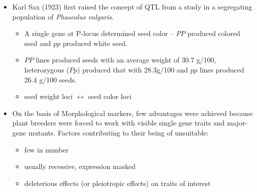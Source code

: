 \documentclass[11pt,dvipsnames,ignorenonframetext,aspectratio=169]{beamer}
\providecommand{\tightlist}{%
  \setlength{\itemsep}{0pt}\setlength{\parskip}{0pt}}
\begin{document}
\begin{frame}{}
\protect\hypertarget{section-3}{}
\begin{itemize}
\tightlist
\item
  Karl Sax (1923) first raised the concept of QTL from a study in a
  \alert{segregating population} of \emph{Phaseolus vulgaris}.

  \begin{itemize}
  \tightlist
  \item
    A single gene at P-locus determined seed color -- \(PP\) produced
    colored seed and \(pp\) produced white seed.
  \item
    \(PP\) lines produced seeds with an average weight of 30.7 g/100,
    heterozygous (\(Pp\)) produced that with 28.3g/100 and \(pp\) lines
    produced 26.4 g/100 seeds.
  \item
    seed weight loci \(\longleftrightarrow\) seed color loci
  \end{itemize}
\item
  On the basis of \alert{Morphological markers}, few advantages were
  achieved because plant breeders were forced to work with visible
  single gene traits and major-gene mutants. Factors contributing to
  their being of unsuitable:

  \begin{itemize}
  \tightlist
  \item
    few in number
  \item
    usually recessive, expression masked
  \item
    deleterious effects (or pleiotropic effects) on traits of interest
  \end{itemize}
\end{itemize}
\end{frame}
\end{document}
